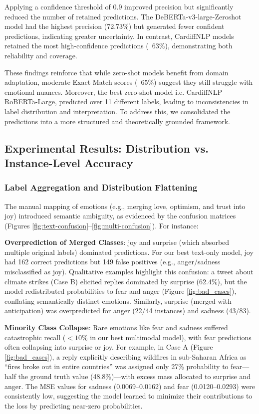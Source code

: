 Applying a confidence threshold of 0.9 improved precision but significantly reduced the number of retained predictions. The DeBERTa-v3-large-Zeroshot model had the highest precision (72.73\%) but generated fewer confident predictions, indicating greater uncertainty. In contrast, CardiffNLP models retained the most high-confidence predictions (~63\%), demonstrating both reliability and coverage.
\newline

These findings reinforce that while zero-shot models benefit from domain adaptation, moderate Exact Match scores (~65\%) suggest they still struggle with emotional nuances. Moreover, the best zero-shot model i.e. CardiffNLP RoBERTa-Large, predicted over 11 different labels, leading to inconsistencies in label distribution and interpretation. To address this, we consolidated the predictions into a more structured and theoretically grounded framework.


\subsection{Experimental Results: Distribution vs. Instance-Level Accuracy}

\subsubsection*{Label Aggregation and Distribution Flattening}
The manual mapping of emotions (e.g., merging love, optimism, and trust into joy) introduced semantic ambiguity, as evidenced by the confusion matrices (Figures \ref{fig:text-confusion}--\ref{fig:multi-confusion}). For instance:
\newline

\textbf{Overprediction of Merged Classes}: joy and surprise (which absorbed multiple original labels) dominated predictions. For our best text-only model, joy had 162 correct predictions but 149 false positives (e.g., anger/sadness misclassified as joy). Qualitative examples highlight this confusion: a tweet about climate strikes (Case B) elicited replies dominated by surprise (62.4\%), but the model redistributed probabilities to fear and anger (Figure \ref{fig:bad_cases}), conflating semantically distinct emotions. Similarly, surprise (merged with anticipation) was overpredicted for anger (22/44 instances) and sadness (43/83).
\newline

\textbf{Minority Class Collapse}: Rare emotions like fear and sadness suffered catastrophic recall ($<10\%$ in our best multimodal model), with fear predictions often collapsing into surprise or joy. For example, in Case A (Figure \ref{fig:bad_cases}), a reply explicitly describing wildfires in sub-Saharan Africa as “fires broke out in entire countries” was assigned only 27\% probability to fear—half the ground truth value (48.8\%)—with excess mass allocated to surprise and anger. The MSE values for sadness (0.0069–0.0162) and fear (0.0120–0.0293) were consistently low, suggesting the model learned to minimize their contributions to the loss by predicting near-zero probabilities.
\newline

